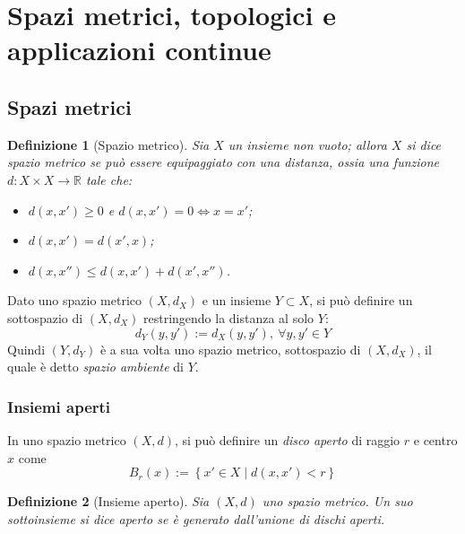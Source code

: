 \documentclass[11pt, a4paper]{scrartcl}
\theoremstyle{style1}
\newtheorem{definizione}{Definizione}[section]
\numberwithin{equation}{subsection}
\begin{document}
\newpage
\section{Spazi metrici, topologici e applicazioni continue}
\subsection{Spazi metrici}
\begin{definizione}
	[Spazio metrico]
Sia $X$ un insieme non vuoto; allora $X$ si dice spazio metrico se pu\`o essere equipaggiato con una \textit{distanza}, ossia una funzione $d : X \times X \to \mathbb{R}$ tale che:
\begin{itemize}
	\item $d(x,x') \ge  0 $ e $d(x,x') = 0 \iff x=x'$;
	\item $d(x,x') = d(x',x)$;
	\item $d(x,x'') \le  d(x,x') + d(x',x'')$.
\end{itemize}
\end{definizione}
\noindent Dato uno spazio metrico $(X,d_X)$ e un insieme $Y \subset  X$, si pu\`o definire un sottospazio di $(X,d_X)$ restringendo la distanza al solo $Y$:
\[
d_Y (y,y') := d_X(y,y'), \ \forall y,y' \in Y
\] 
Quindi $(Y,d_Y)$ \`e a sua volta uno spazio metrico, sottospazio di $(X,d_X)$, il quale \`e detto \textit{spazio ambiente} di $Y$.
\subsubsection{Insiemi aperti}
In uno spazio metrico $(X,d)$, si pu\`o definire un \textit{disco aperto} di raggio $r$ e centro $x$ come
\[
B_r(x) := \left\{ x' \in X  \mid d(x,x') < r \right\} 
\] 
\begin{definizione}
	[Insieme aperto]
	Sia $(X,d)$ uno spazio metrico. Un suo sottoinsieme si dice aperto se \`e generato dall'unione di dischi aperti.
\end{definizione}
\end{document}
